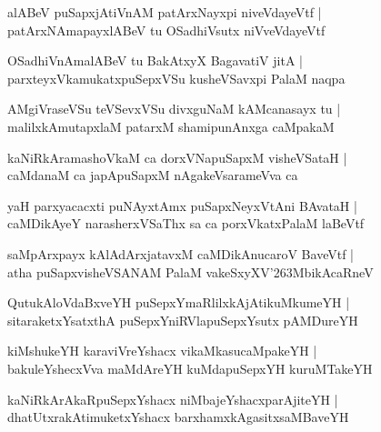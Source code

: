 \documentclass[twoside,12pt,openright]{book}
\def\S{\char'263}
\newcounter{shloka}[chapter]
\begin{document}
\begin{shloka}%
alABeV puSapxjAtiVnAM patArxNayxpi niveVdayeVtf |\\
patArxNAmapayxlABeV tu OSadhiVsutx niVveVdayeVtf 
\end{shloka}

\begin{shloka}%
OSadhiVnAmalABeV tu BakAtxyX BagavatiV jitA |\\
parxteyxVkamukatxpuSepxVSu kusheVSavxpi PalaM naqpa
\end{shloka}

\begin{shloka}%
AMgiVraseVSu teVSevxVSu divxguNaM kAMcanasayx tu |\\
malilxkAmutapxlaM patarxM shamipunAnxga caMpakaM
\end{shloka}

\begin{shloka}%
kaNiRkAramashoVkaM ca dorxVNapuSapxM visheVSataH |\\
caMdanaM ca japApuSapxM nAgakeVsarameVva ca 
\end{shloka}

\begin{shloka}%
yaH parxyacacxti puNAyxtAmx puSapxNeyxVtAni BAvataH |\\
caMDikAyeY narasherxVSaThx sa ca porxVkatxPalaM laBeVtf
\end{shloka}

\begin{shloka}%
saMpArxpayx kAlAdArxjatavxM caMDikAnucaroV BaveVtf |\\
atha puSapxvisheVSANAM PalaM vakeSxyXV\S MbikAcaRneV 
\end{shloka}

\begin{shloka}%
QutukAloVdaBxveYH puSepxYmaRlilxkAjAtikuMkumeYH |\\
sitaraketxYsatxthA puSepxYniRVlapuSepxYsutx pAMDureYH
\end{shloka}

\begin{shloka}%
kiMshukeYH karaviVreYshacx vikaMkasucaMpakeYH |\\
bakuleYshecxVva maMdAreYH kuMdapuSepxYH kuruMTakeYH
\end{shloka}

\begin{shloka}%
kaNiRkArAkaRpuSepxYshacx niMbajeYshacxparAjiteYH |\\
dhatUtxrakAtimuketxYshacx barxhamxkAgasitxsaMBaveYH
\end{shloka}
\end{document}
